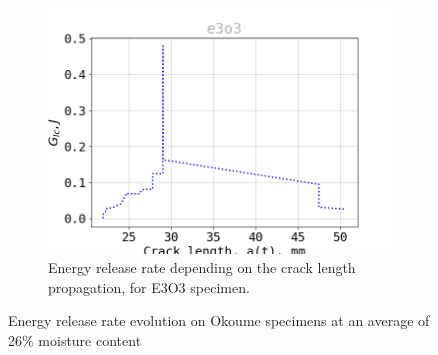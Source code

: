 \begin{figure}[H]
\begin{subfigure}{0.48\linewidth}
	\centering
	\includegraphics[scale=0.3]{Figures/e3o3_G}
	\decoRule
	\caption[Energy release rate E3O3]{Energy release rate depending on the crack length propagation, for E3O3 specimen.}
	\label{fig:E3O3_G}
\end{subfigure}
\caption{Energy release rate evolution on Okoume specimens at an average of 26\% moisture content}
\label{E3o_G}
\end{figure}
\newpage
